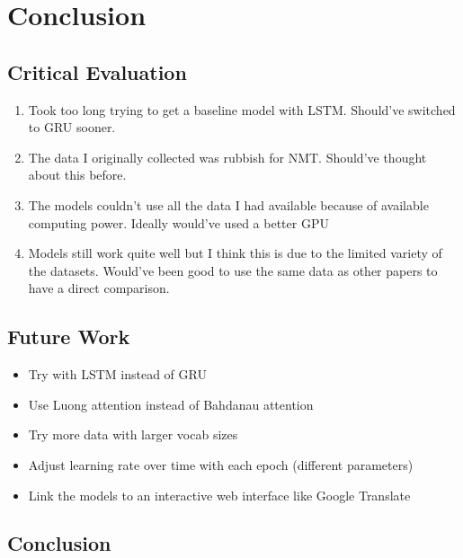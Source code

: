 
\chapter{Conclusion}
\newpage
\section{Critical Evaluation}

\begin{enumerate}
    \item Took too long trying to get a baseline model with LSTM. Should've switched to GRU sooner.
    \item The data I originally collected was rubbish for NMT. Should've thought about this before.
    \item The models couldn't use all the data I had available because of available computing power. Ideally would've used a better GPU
    \item Models still work quite well but I think this is due to the limited variety of the datasets. Would've been good to use the same data as other papers to have a direct comparison.
\end{enumerate}


\section{Future Work}

\begin{itemize}
    \item Try with LSTM instead of GRU
    \item Use Luong \cite{luong_effective_2015} attention instead of Bahdanau \cite{bahdanau_neural_2016} attention
    \item Try more data with larger vocab sizes
    \item Adjust learning rate over time with each epoch (different parameters)
    \item Link the models to an interactive web interface like Google Translate
\end{itemize}


\section{Conclusion}
